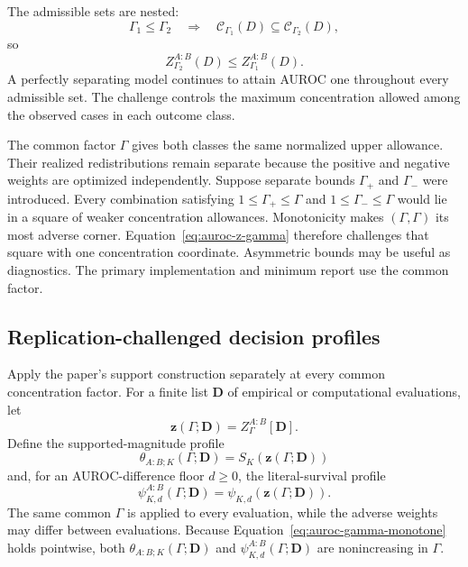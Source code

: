 \documentclass[11pt]{article}
\newcommand{\CSet}{\mathcal{C}}
\theoremstyle{remark}
\begin{document}
The admissible sets are nested:
\[
\Gamma_1\leq\Gamma_2
\quad\Longrightarrow\quad
\CSet_{\Gamma_1}(D)\subseteq\CSet_{\Gamma_2}(D),
\]
so
\begin{equation}
Z_{\Gamma_2}^{A:B}(D)
\leq
Z_{\Gamma_1}^{A:B}(D).
\label{eq:auroc-gamma-monotone}
\end{equation}
A perfectly separating model continues to attain AUROC one throughout every
admissible set. The challenge controls the maximum concentration allowed among
the observed cases in each outcome class.

The common factor $\Gamma$ gives both classes the same normalized upper
allowance. Their realized redistributions remain separate because the positive
and negative weights are optimized independently. Suppose separate bounds
$\Gamma_+$ and $\Gamma_-$ were introduced. Every combination satisfying
$1\leq\Gamma_+\leq\Gamma$ and $1\leq\Gamma_-\leq\Gamma$ would lie in a square
of weaker concentration allowances. Monotonicity makes $(\Gamma,\Gamma)$ its
most adverse corner. Equation~\eqref{eq:auroc-z-gamma} therefore challenges
that square with one concentration coordinate. Asymmetric bounds may be useful
as diagnostics. The primary implementation and minimum report use the common
factor.

\subsection{Replication-challenged decision profiles}

Apply the paper's support construction separately at every common concentration
factor. For a finite list $\mathbf D$ of empirical or computational evaluations, let
\[
\mathbf z(\Gamma;\mathbf D)
=
Z_\Gamma^{A:B}[\mathbf D].
\]
Define the supported-magnitude profile
\begin{equation}
\theta_{A:B;K}(\Gamma;\mathbf D)
=
S_K\!\left(\mathbf z(\Gamma;\mathbf D)\right)
\label{eq:auroc-theta-gamma}
\end{equation}
and, for an AUROC-difference floor $d\geq0$, the literal-survival profile
\begin{equation}
\psi_{K,d}^{A:B}(\Gamma;\mathbf D)
=
\psi_{K,d}\!\left(\mathbf z(\Gamma;\mathbf D)\right).
\label{eq:auroc-psi-gamma}
\end{equation}
The same common $\Gamma$ is applied to every evaluation, while the adverse
weights may differ between evaluations. Because
Equation~\eqref{eq:auroc-gamma-monotone} holds pointwise, both
$\theta_{A:B;K}(\Gamma;\mathbf D)$ and $\psi_{K,d}^{A:B}(\Gamma;\mathbf D)$ are nonincreasing in
$\Gamma$.
\end{document}
